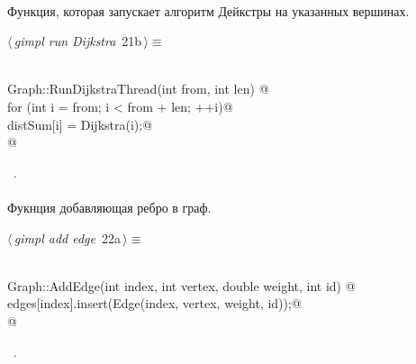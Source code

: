 \documentclass[12pt]{article}
\begin{document}
\paragraph{}
Функция, которая запускает алгоритм Дейкстры на указанных вершинах.
\begin{flushleft} \small
\begin{minipage}{\linewidth}\label{scrap38}\raggedright\small
{} $\langle\,${\itshape gimpl run Dijkstra}\nobreak\ {\footnotesize {21b}}$\,\rangle\equiv$
\vspace{-1ex}
\begin{list}{}{} \item
\mbox{}\verb@@\\
\mbox{}\verb@void Graph::RunDijkstraThread(int from, int len) {@\\
\mbox{}\verb@    for (int i = from; i < from + len; ++i)@\\
\mbox{}\verb@        distSum[i] = Dijkstra(i);@\\
\mbox{}\verb@}@\\
\mbox{}\verb@@{\NWsep}
\end{list}
\vspace{-1.5ex}
\footnotesize
\begin{list}{}{\setlength{\itemsep}{-\parsep}\setlength{\itemindent}{-\leftmargin}}
\item \NWtxtMacroRefIn\ .

\item{}
\end{list}
\end{minipage}\vspace{4ex}
\end{flushleft}
\paragraph{}
Фукнция добавляющая ребро в граф.
\begin{flushleft} \small
\begin{minipage}{\linewidth}\label{scrap39}\raggedright\small
{} $\langle\,${\itshape gimpl add edge}\nobreak\ {\footnotesize {22a}}$\,\rangle\equiv$
\vspace{-1ex}
\begin{list}{}{} \item
\mbox{}\verb@@\\
\mbox{}\verb@void Graph::AddEdge(int index, int vertex, double weight, int id) {@\\
\mbox{}\verb@    edges[index].insert(Edge(index, vertex, weight, id));@\\
\mbox{}\verb@}@\\
\mbox{}\verb@@{\NWsep}
\end{list}
\vspace{-1.5ex}
\footnotesize
\begin{list}{}{\setlength{\itemsep}{-\parsep}\setlength{\itemindent}{-\leftmargin}}
\item \NWtxtMacroRefIn\ .

\item{}
\end{list}
\end{minipage}\vspace{4ex}
\end{flushleft}
\end{document}
